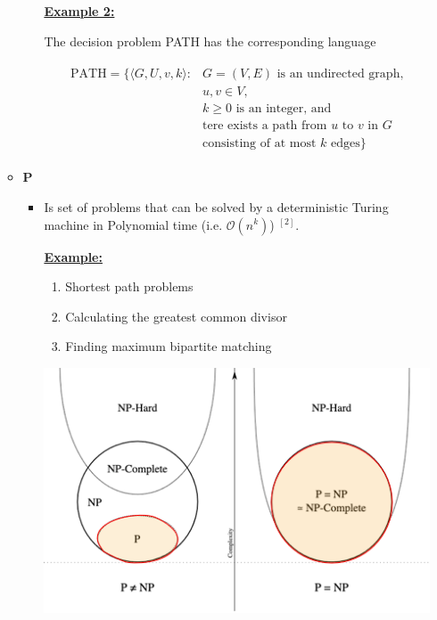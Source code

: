 \documentclass[12pt]{article}
\begin{document}
\begin{enumerate}[1.]
\begin{itemize}
\begin{itemize}
            \bigskip

            \underline{\textbf{Example 2:}}

            \bigskip

            The decision problem PATH has the corresponding language

            \bigskip

            \begin{align*}
                \begin{split}\text{PATH} = \{\langle G,U,v,k \rangle:&  \text{$G = (V,E)$ is an undirected graph,}\\&\text{$u,v \in V$,}\\&\text{$k \geq 0$ is an integer, and}\\&\text{tere exists a path from $u$ to $v$ in $G$}\\&\text{consisting of at most $k$ edges}\}\end{split}
            \end{align*}
        \end{itemize}

        \item \textbf{P}

        \begin{itemize}
            \item Is set of problems that can be solved by a deterministic Turing machine in Polynomial time (i.e. $\mathcal{O}(n^k)$) $^{[2]}$.

            \bigskip

            \underline{\textbf{Example:}}

            \bigskip

            \begin{enumerate}[1)]
                \item Shortest path problems
                \item Calculating the greatest common divisor
                \item Finding maximum bipartite matching
            \end{enumerate}

            \bigskip

            \begin{center}
            \includegraphics[width=0.7\linewidth]{images/worksheet_7_solution_1.png}
            \end{center}
        \end{itemize}


\end{itemize}
\end{enumerate}
\end{document}
